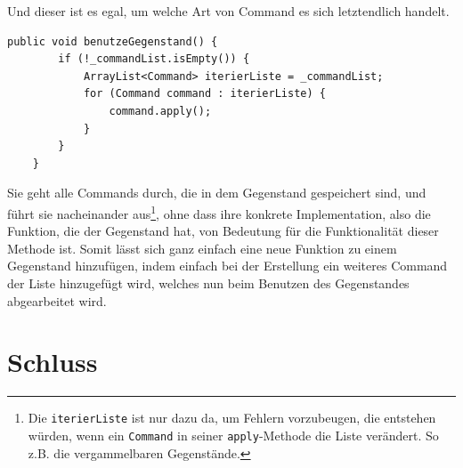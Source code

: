 \documentclass[12pt,twoside]{article}
\theoremstyle{plain}
\theoremstyle{definition}
\theoremstyle{remark}
\begin{document}
Und dieser ist es egal, um welche Art von Command es sich letztendlich handelt.
\begin{lstlisting}[caption=die benutzeGegenstand-Methode aus der Klasse Gegenstand, label=code:main_gegenstand]
	public void benutzeGegenstand() {
		if (!_commandList.isEmpty()) {
			ArrayList<Command> iterierListe = _commandList;
			for (Command command : iterierListe) {
				command.apply();
			}
		}
	}
\end{lstlisting}
Sie geht alle Commands durch, die in dem Gegenstand gespeichert sind, und führt sie nacheinander aus\footnote{Die \texttt{iterierListe} ist nur dazu da, um Fehlern vorzubeugen, die entstehen würden, wenn ein \texttt{Command} in seiner \texttt{apply}-Methode die Liste verändert. So z.B. die vergammelbaren Gegenstände.}, ohne dass ihre konkrete Implementation, also die Funktion, die der Gegenstand hat, von Bedeutung für die Funktionalität dieser Methode ist. Somit lässt sich ganz einfach eine neue Funktion zu einem Gegenstand hinzufügen, indem einfach bei der Erstellung ein weiteres Command der Liste hinzugefügt wird, welches nun beim Benutzen des Gegenstandes abgearbeitet wird.

\section{Schluss}
\label{sec:end}
\end{document}
